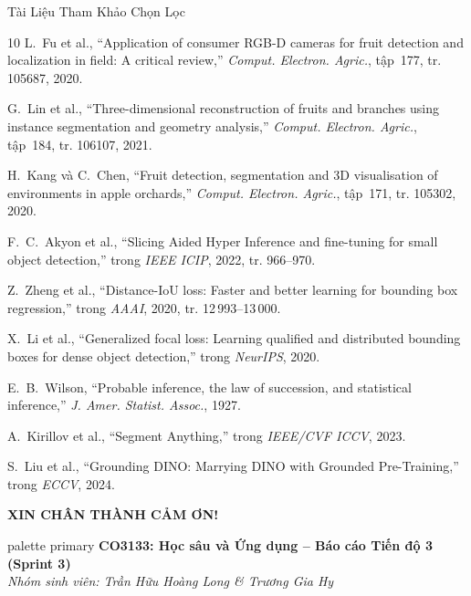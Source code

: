 \documentclass[aspectratio=169, 10pt]{beamer}
\begin{document}
\begin{frame}[allowframebreaks]{Tài Liệu Tham Khảo Chọn Lọc}
\scriptsize
\begin{thebibliography}{10}
L.~Fu et al., ``Application of consumer RGB-D cameras for fruit detection and localization in field: A critical review,'' \textit{Comput. Electron. Agric.}, tập~177, tr. 105687, 2020.

G.~Lin et al., ``Three-dimensional reconstruction of fruits and branches using instance segmentation and geometry analysis,'' \textit{Comput. Electron. Agric.}, tập~184, tr. 106107, 2021.

H.~Kang và C.~Chen, ``Fruit detection, segmentation and 3D visualisation of environments in apple orchards,'' \textit{Comput. Electron. Agric.}, tập~171, tr. 105302, 2020.

F.~C.~Akyon et al., ``Slicing Aided Hyper Inference and fine-tuning for small object detection,'' trong \textit{IEEE ICIP}, 2022, tr. 966--970.

Z.~Zheng et al., ``Distance-IoU loss: Faster and better learning for bounding box regression,'' trong \textit{AAAI}, 2020, tr. 12\,993--13\,000.

X.~Li et al., ``Generalized focal loss: Learning qualified and distributed bounding boxes for dense object detection,'' trong \textit{NeurIPS}, 2020.

E.~B.~Wilson, ``Probable inference, the law of succession, and statistical inference,'' \textit{J. Amer. Statist. Assoc.}, 1927.

A.~Kirillov et al., ``Segment Anything,'' trong \textit{IEEE/CVF ICCV}, 2023.

S.~Liu et al., ``Grounding DINO: Marrying DINO with Grounded Pre-Training,'' trong \textit{ECCV}, 2024.
\end{thebibliography}
\end{frame}

\begin{frame}
\centering
\vspace{1.0cm}
{\Huge\bfseries\color{bkblue} XIN CHÂN THÀNH CẢM ƠN!}\\[0.4cm]

\begin{beamercolorbox}[sep=8pt,center,rounded=true,shadow=true]{palette primary}
    \textbf{CO3133: Học sâu và Ứng dụng -- Báo cáo Tiến độ 3 (Sprint 3)}\\
    \textit{Nhóm sinh viên: Trần Hữu Hoàng Long \& Trương Gia Hy}
\end{beamercolorbox}
\end{frame}
\end{document}
